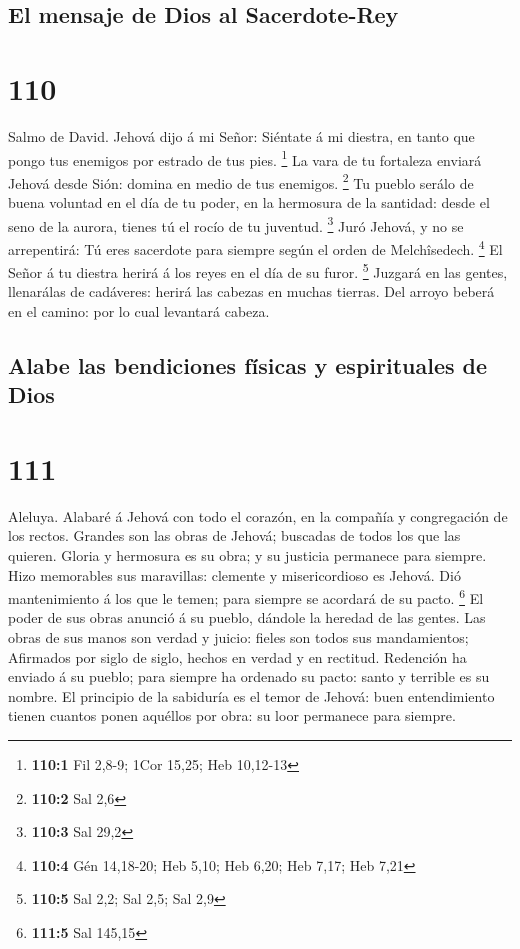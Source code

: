 \hypertarget{el-mensaje-de-dios-al-sacerdote-rey}{%
\subsection{El mensaje de Dios al
Sacerdote-Rey}\label{el-mensaje-de-dios-al-sacerdote-rey}}

\hypertarget{section-109}{%
\section{110}\label{section-109}}

 Salmo de David. Jehová dijo á mi Señor: Siéntate á mi
diestra, en tanto que pongo tus enemigos por estrado de tus pies.
\footnote{\textbf{110:1} Fil 2,8-9; 1Cor 15,25; Heb 10,12-13}
 La vara de tu fortaleza enviará Jehová desde Sión: domina
en medio de tus enemigos. \footnote{\textbf{110:2} Sal 2,6} 
Tu pueblo serálo de buena voluntad en el día de tu poder, en la
hermosura de la santidad: desde el seno de la aurora, tienes tú el rocío
de tu juventud. \footnote{\textbf{110:3} Sal 29,2}  Juró
Jehová, y no se arrepentirá: Tú eres sacerdote para siempre según el
orden de Melchîsedech. \footnote{\textbf{110:4} Gén 14,18-20; Heb 5,10;
  Heb 6,20; Heb 7,17; Heb 7,21}  El Señor á tu diestra
herirá á los reyes en el día de su furor. \footnote{\textbf{110:5} Sal
  2,2; Sal 2,5; Sal 2,9}  Juzgará en las gentes, llenarálas
de cadáveres: herirá las cabezas en muchas tierras.  Del
arroyo beberá en el camino: por lo cual levantará cabeza.

\hypertarget{alabe-las-bendiciones-fuxedsicas-y-espirituales-de-dios}{%
\subsection{Alabe las bendiciones físicas y espirituales de
Dios}\label{alabe-las-bendiciones-fuxedsicas-y-espirituales-de-dios}}

\hypertarget{section-110}{%
\section{111}\label{section-110}}

 Aleluya. Alabaré á Jehová con todo el corazón, en la
compañía y congregación de los rectos.  Grandes son las
obras de Jehová; buscadas de todos los que las quieren. 
Gloria y hermosura es su obra; y su justicia permanece para siempre.
 Hizo memorables sus maravillas: clemente y misericordioso
es Jehová.  Dió mantenimiento á los que le temen; para
siempre se acordará de su pacto. \footnote{\textbf{111:5} Sal 145,15}
 El poder de sus obras anunció á su pueblo, dándole la
heredad de las gentes.  Las obras de sus manos son verdad y
juicio: fieles son todos sus mandamientos;  Afirmados por
siglo de siglo, hechos en verdad y en rectitud.  Redención
ha enviado á su pueblo; para siempre ha ordenado su pacto: santo y
terrible es su nombre.  El principio de la sabiduría es el
temor de Jehová: buen entendimiento tienen cuantos ponen aquéllos por
obra: su loor permanece para siempre.


